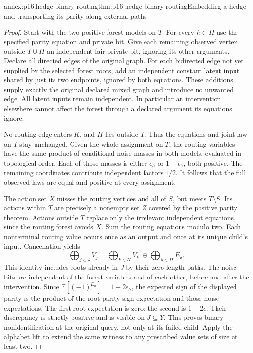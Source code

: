 \begin{annexitem}{annex:p16.hedge-binary-routing}{thm:p16-hedge-binary-routing}{Embedding a hedge and transporting its parity along external paths}
\begin{proof}
Start with the two positive forest models on \(T\). For every
\(h\in H\) use the specified parity equation and private bit.
Give each remaining observed vertex outside \(T\cup H\) an
independent fair private bit, ignoring its other arguments. Declare
all directed edges of the original graph. For each bidirected edge
not yet supplied by the selected forest roots, add an independent
constant latent input shared by just its two endpoints, ignored by
both equations. These additions supply exactly the original declared
mixed graph and introduce no unwanted edge. All latent inputs remain
independent. In particular an intervention elsewhere cannot affect
the forest through a declared argument its equations ignore.

No routing edge enters \(K\), and \(H\) lies outside \(T\).
Thus the equations and joint law on \(T\) stay unchanged. Given
the whole assignment on \(T\), the routing variables have the
same product of conditional noise masses in both models, evaluated
in topological order. Each of those masses is either \(\epsilon_h\)
or \(1-\epsilon_h\), both positive. The remaining coordinates
contribute independent factors \(1/2\). It follows that the
full observed laws are equal and positive at every assignment.

The action set \(X\) misses the routing vertices and all of
\(S\), but meets \(T\setminus S\). Its actions within
\(T\) are precisely a nonempty set \(Z\) covered by the
positive parity theorem. Actions outside \(T\) replace only
the irrelevant independent equations, since the routing forest
avoids \(X\). Sum the routing equations modulo two. Each
nonterminal routing value occurs once as an output and once at
its unique child's input. Cancellation yields
\[
 \bigoplus_{j\in J}V_j
   =\bigoplus_{k\in K}V_k\ \oplus\!
      \bigoplus_{h\in H}E_h.
\]
This identity includes roots already in \(J\) by their zero-length
paths. The noise bits are independent of the forest variables and
of each other, before and after the intervention. Since
\(\mathbb E[(-1)^{E_h}]=1-2\epsilon_h\), the expected sign
of the displayed parity is the product of the root-parity sign
expectation and those noise expectations. The first root expectation
is zero; the second is \(1-2\epsilon\). Their discrepancy is
strictly positive and is visible on \(J\subseteq Y\).
This proves binary nonidentification at the original query, not
only at its failed child. Apply the alphabet lift to extend the
same witness to any prescribed value sets of size at least two.
\end{proof}
\end{annexitem}

